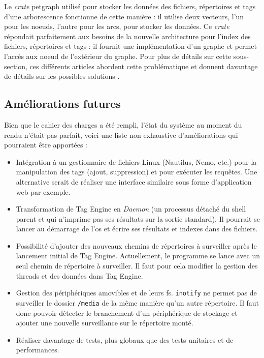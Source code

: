 \bigbreak
Le \textit{crate} petgraph utilisé pour stocker les données des fichiers, répertoires et tags d'une 
arborescence fonctionne de cette manière : il utilise deux vecteurs, l'un pour les noeuds, l'autre 
pour les arcs, pour stocker les données. Ce \textit{crate} répondait parfaitement aux besoins de 
la nouvelle architecture pour l'index des fichiers, répertoires et tags : il fournit une implémentation 
d'un graphe et permet l'accès aux noeud de l'extérieur du graphe.
Pour plus de détails sur cette sous-section, ces différents articles abordent cette problématique 
et donnent davantage de détails sur les possibles solutions \cite{ref2} \cite{ref26} \cite{ref49} 
\cite{ref46} \cite{ref47} \cite{ref48}.

\subsection{Améliorations futures}
Bien que le cahier des charges a été rempli, l'état du système au moment du rendu n'était pas parfait, 
voici une liste non exhaustive d'améliorations qui pourraient être apportées :
\begin{itemize}
    \item Intégration à un gestionnaire de fichiers Linux (Nautilus, Nemo, etc.) pour la manipulation
        des tags (ajout, suppression) et pour exécuter les requêtes. Une alternative serait de réaliser 
        une interface similaire sous forme d'application web par exemple.
    \item Transformation de Tag Engine en \textit{Daemon} (un processus détaché du shell parent et 
        qui n'imprime pas ses résultats sur la sortie standard). Il pourrait se lancer au démarrage 
        de l'\acrshort{os} et écrire ses résultats et indexes dans des fichiers.
    \item Possibilité d'ajouter des nouveaux chemins de répertoires à surveiller après le lancement 
        initial de Tag Engine. Actuellement, le programme se lance avec un seul chemin de répertoire
        à surveiller. Il faut pour cela modifier la gestion des threads et des données dans Tag 
        Engine.
    \item Gestion des périphériques amovibles et de leurs \acrshort{fs}. \texttt{inotify} ne 
        permet pas de surveiller le dossier \texttt{/media} de la même manière qu'un 
        autre répertoire. Il faut donc pouvoir détecter le branchement d'un périphérique de stockage 
        et ajouter une nouvelle surveillance sur le répertoire monté.
    \item Réaliser davantage de tests, plus globaux que des tests unitaires et de performances.
\end{itemize}
